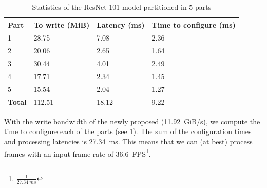 \begin{table}[hbtp]
\centering
\begin{tabular}{@{}llll@{}}
\toprule
\textbf{Part}  & \textbf{To write (MiB)} & \textbf{Latency (ms)} & \textbf{Time to configure (ms)} \\ \midrule
1              & 28.75                   & 7.08                  & 2.36                            \\
2              & 20.06                   & 2.65                  & 1.64                            \\
3              & 30.44                   & 4.01                  & 2.49                            \\
4              & 17.71                   & 2.34                  & 1.45                            \\
5              & 15.54                   & 2.04                  & 1.27                            \\ \midrule
\textbf{Total} & 112.51                  & 18.12                 & 9.22                            \\ \bottomrule
\end{tabular}
\caption{Statistics of the ResNet-101 model partitioned in 5 parts}
\label{tab:resnet101_5parts}
\end{table}
With the write bandwidth of the newly proposed \confignoc{} (\SI{11.92}{GiB/s}), we compute the time to configure each of the parts (see \cref{tab:resnet101_5parts}).
The sum of the configuration times and processing latencies is \SI{27.34}{ms}.
This means that we can (at best) process frames with an input frame rate of \SI{36.6}{FPS}\footnote{$\frac{1}{\SI{27.34}{ms}}$}.



